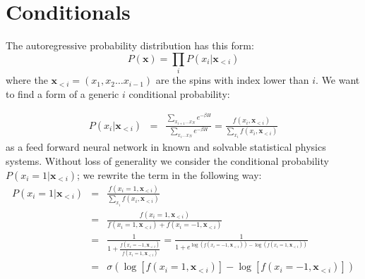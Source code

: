 \documentclass{article}
\begin{document}
\section{Conditionals}
The autoregressive probability distribution has this form:
\begin{equation}
P\left(\mathbf{x}\right)=\prod_{i}P\left(x_{i}|\mathbf{x}_{<i}\right)
\end{equation}
where the $\mathbf{x}_{<i}=\left(x_{1},x_{2}\dots x_{i-1}\right)$
are the spins with index lower than $i$. We want to find a form of a generic $i$ conditional probability: 

\begin{eqnarray}
P\left(x_{i}|\mathbf{x}_{<i}\right) & = & \frac{\sum_{x_{i+1}\dots x_{N}}e^{-\beta H}}{\sum_{x_{i}\dots x_{N}}e^{-\beta H}} = \frac{f\left(x_{i},\mathbf{x}_{<i}\right)}{\sum_{x_{i}}f\left(x_{i},\mathbf{x}_{<i}\right)}
\label{eq:chain}
\end{eqnarray}
as a feed forward neural network in known and solvable statistical physics systems. Without loss of generality we consider the conditional probability $P\left(x_{i}=1|\mathbf{x}_{<i}\right)$; we rewrite the term in the following way: 
\begin{eqnarray}
\label{eq:sigma_log}
P\left(x_{i}=1|\mathbf{x}_{<i}\right) & = & \frac{f\left(x_{i}=1,\mathbf{x}_{<i}\right)}{\sum_{x_{i}}f\left(x_{i},\mathbf{x}_{<i}\right)}\\
& = &\frac{f\left(x_{i}=1,\mathbf{x}_{<i}\right)}{f\left(x_{i}=1,\mathbf{x}_{<i}\right)+f\left(x_{i}=-1,\mathbf{x}_{<i}\right)}\\
& = &\frac{1}{1+\frac{f\left(x_{i}=-1,\mathbf{x}_{<i}\right)}{f\left(x_{i}=1,\mathbf{x}_{<i}\right)}} = \frac{1}{1+e^{\log\left(f\left(x_{i}=-1,\mathbf{x}_{<i}\right)\right)-\log\left(f\left(x_{i}=1,\mathbf{x}_{<i}\right)\right)}}\\
& = &\sigma\left(\log\left[f\left(x_{i}=1,\mathbf{x}_{<i}\right)\right]-\log\left[f\left(x_{i}=-1,\mathbf{x}_{<i}\right)\right]\right)
\end{eqnarray}
\end{document}
